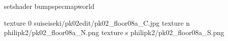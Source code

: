 setshader bumpspecmapworld

texture 0 suiseiseki/pk02edit/pk02_floor08a_C.jpg
texture n philipk2/pk02_floor08a_N.png
texture s philipk2/pk02_floor08a_S.png

